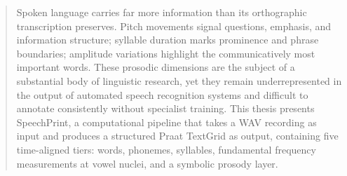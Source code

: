 \begin{abstract}






Spoken language carries far more information than its orthographic transcription preserves. Pitch movements signal questions, emphasis, and information structure; syllable duration marks prominence and phrase boundaries; amplitude variations highlight the communicatively most important words. These prosodic dimensions are the subject of a substantial body of linguistic research, yet they remain underrepresented in the output of automated speech recognition systems and difficult to annotate consistently without specialist training. This thesis presents SpeechPrint, a computational pipeline that takes a WAV recording as input and produces a structured Praat TextGrid as output, containing five time-aligned tiers: words, phonemes, syllables, fundamental frequency measurements at vowel nuclei, and a symbolic prosody layer.


\end{abstract}
